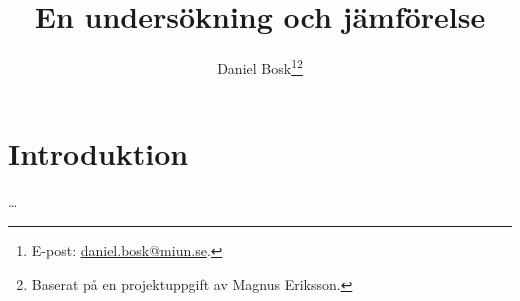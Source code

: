 \documentclass[a4paper]{miunasgn}
\title{En undersökning och jämförelse}
\author{Daniel Bosk\footnote{%
		E-post: \href{mailto:daniel.bosk@miun.se}{daniel.bosk@miun.se}.
	}\thanks{%
		Baserat på en projektuppgift av Magnus Eriksson.
	}
}
\date{\svnId}
\begin{document}
\maketitle
\thispagestyle{foot}
\tableofcontents


\section{Introduktion}
\noindent
\dots


\end{document}
